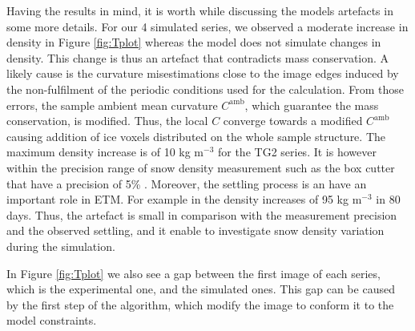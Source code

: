 \documentclass[draft,ms]{agujournal2019}
\begin{document}
Having the results in mind, it is worth while discussing the models artefacts in some more details. 
For our 4 simulated series, we observed a moderate increase in density in Figure \ref{fig:Tplot} whereas the model does not simulate changes in density. This change is thus an artefact that contradicts mass conservation. A likely cause is the curvature misestimations close to the image edges induced by the non-fulfilment of the periodic conditions used for the calculation. From those errors, the sample ambient mean curvature $C^{\mathrm{amb}}$, which guarantee the mass conservation, is modified. Thus, the local $C$ converge towards a modified $C^{\mathrm{amb}}$ causing addition of ice voxels distributed on the whole sample structure. The maximum density increase is of 10 kg m$^{-3}$ for the TG2 series. It is however within the precision range of snow density measurement such as the box cutter that have a precision of 5\% \cite{proksch2016intercomparison}. Moreover, the settling process is an have an important role in ETM. For example in  the density increases of 95 kg m$^{-3}$ in 80 days. Thus, the artefact is small in comparison with the measurement precision and the observed settling, and it enable to investigate snow density variation during the simulation.

In Figure \ref{fig:Tplot} we also see a gap between the first image of each series, which is the experimental one, and the simulated ones. This gap can be caused by the first step of the algorithm, which modify the image to conform it to the model constraints.



\end{document}
